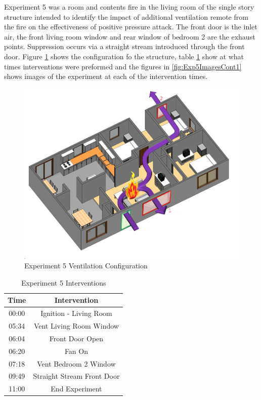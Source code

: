 \documentclass{article}
\begin{document}
Experiment 5 was a room and contents fire in the living room of the single story structure intended to identify the impact of additional ventilation remote from the fire on the effectiveness of positive pressure attack. The front door is the inlet air, the front living room window and rear window of bedroom 2 are the exhaust points. Suppression occurs via a straight stream introduced through the front door. Figure \ref{fig:Exp5VentConfig} shows the configuration fo the structure, table \ref{Table:Exp5Interventions} show at what times interventions were preformed and the figures in \ref{fig:Exp5ImagesCont1} shows images of the experiment at each of the intervention times.

\begin{figure}[h!]
	\centering
	\includegraphics[width=5in]{0_Images/FireExperiments/Single_Story/Experiment_5.jpg}
	\caption{Experiment 5 Ventilation Configuration}
	\label{fig:Exp5VentConfig}
\end{figure}


\begin{table}[H]
	\centering
	\caption{Experiment 5 Interventions}
	\begin{tabular}{|c|c|} 
		\hline
		Time & Intervention \\ \hline \hline
		00:00 & Ignition - Living Room \\ \hline
		05:34 & Vent Living Room Window \\ \hline
		06:04 & Front Door Open \\ \hline
		06:20 & Fan On \\ \hline
		07:18 & Vent Bedroom 2 Window \\ \hline
		09:49 & Straight Stream Front Door \\ \hline
		11:00 & End Experiment \\ \hline
	\end{tabular}
	\label{Table:Exp5Interventions}
\end{table}
\end{document}
